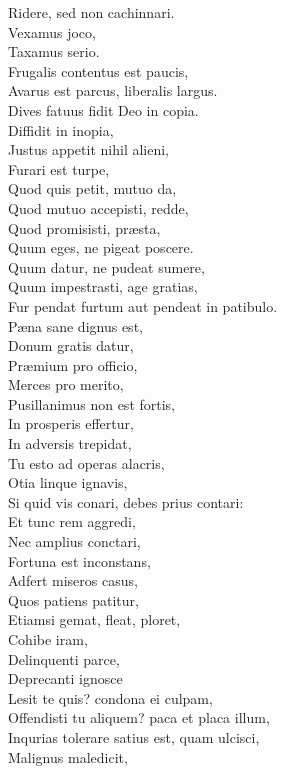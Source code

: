\documentclass[12pt, twocolumn]{memoir}
\begin{document}
Ridere, sed non cachinnari.\\
Vexamus joco,\\
Taxamus serio.\\
Frugalis contentus est paucis,\\
Avarus est parcus, liberalis largus.\\
Dives fatuus fidit Deo in copia.\\
Diffidit in inopia,\\
Justus appetit nihil alieni,\\
Furari est turpe,\\
Quod quis petit, mutuo da,\\
Quod mutuo accepisti, redde,\\
Quod promisisti, præsta,\\
Quum eges, ne pigeat poscere.\\
Quum datur, ne pudeat sumere,\\
Quum impestrasti, age gratias,\\
Fur pendat furtum aut pendeat in patibulo.\\
Pæna sane dignus est,\\
Donum gratis datur,\\
Præmium pro officio,\\
Merces pro merito,\\
Pusillanimus non est fortis,\\
In prosperis effertur,\\
In adversis trepidat,\\
Tu esto ad operas alacris,\\
Otia linque ignavis,\\
Si quid vis conari, debes prius contari:\\
Et tunc rem aggredi,\\
Nec amplius conctari,\\
Fortuna est inconstans,\\
Adfert miseros casus,\\
Quos patiens patitur,\\
Etiamsi gemat, fleat, ploret,\\
Cohibe iram,\\
Delinquenti parce,\\
Deprecanti ignosce\\
Lesit te quis? condona ei culpam,\\
Offendisti tu aliquem? paca et placa illum,\\
Inqurias tolerare satius est, quam ulcisci,\\
Malignus maledicit,\\
\end{document}
